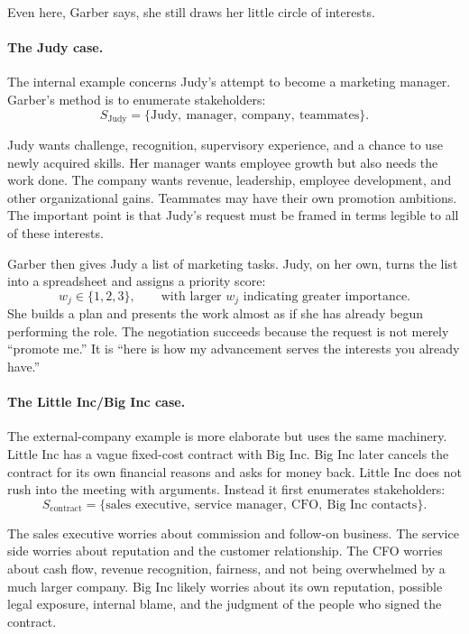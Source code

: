 Even here, Garber says, she still draws her little circle of interests.

\paragraph{The Judy case.} The internal example concerns Judy's attempt to become a marketing manager. Garber's method is to enumerate stakeholders:
\begin{equation}
S_{\text{Judy}} = \{\text{Judy},\ \text{manager},\ \text{company},\ \text{teammates}\}.
\end{equation}

Judy wants challenge, recognition, supervisory experience, and a chance to use newly acquired skills. Her manager wants employee growth but also needs the work done. The company wants revenue, leadership, employee development, and other organizational gains. Teammates may have their own promotion ambitions. The important point is that Judy's request must be framed in terms legible to all of these interests.

Garber then gives Judy a list of marketing tasks. Judy, on her own, turns the list into a spreadsheet and assigns a priority score:
\begin{equation}
w_j \in \{1,2,3\}, \qquad \text{with larger } w_j \text{ indicating greater importance.}
\end{equation}
She builds a plan and presents the work almost as if she has already begun performing the role. The negotiation succeeds because the request is not merely ``promote me.'' It is ``here is how my advancement serves the interests you already have.''

\paragraph{The Little Inc/Big Inc case.} The external-company example is more elaborate but uses the same machinery. Little Inc has a vague fixed-cost contract with Big Inc. Big Inc later cancels the contract for its own financial reasons and asks for money back. Little Inc does not rush into the meeting with arguments. Instead it first enumerates stakeholders:
\begin{equation}
S_{\text{contract}} =
\{\text{sales executive},\ \text{service manager},\ \text{CFO},\ \text{Big Inc contacts}\}.
\end{equation}

The sales executive worries about commission and follow-on business. The service side worries about reputation and the customer relationship. The CFO worries about cash flow, revenue recognition, fairness, and not being overwhelmed by a much larger company. Big Inc likely worries about its own reputation, possible legal exposure, internal blame, and the judgment of the people who signed the contract.

